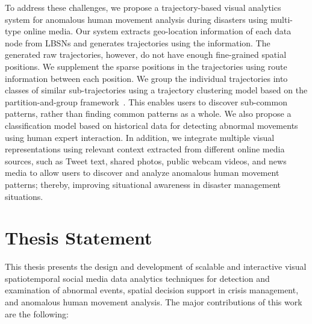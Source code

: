 To address these challenges, we propose a trajectory-based visual analytics system for anomalous human movement analysis during disasters using multi-type online media.
Our system extracts geo-location information of each data node from LBSNs and generates trajectories using the information.
The generated raw trajectories, however, do not have enough fine-grained spatial positions.
We supplement the sparse positions in the trajectories using route information between each position.
We group the individual trajectories into classes of similar sub-trajectories using a trajectory clustering model based on the partition-and-group framework~\cite{Lee:2007:Trajectory}.
This enables users to discover sub-common patterns, rather than finding common patterns as a whole.
We also propose a classification model based on historical data for detecting abnormal movements using human expert interaction.
In addition, we integrate multiple visual representations using relevant context extracted from different online media sources, such as Tweet text, shared photos, public webcam videos, and news media to allow users to discover and analyze anomalous human movement patterns; thereby, improving situational awareness in disaster management situations. 

\section{ Thesis Statement}
\label{sec:statement}

This thesis presents the design and development of scalable and interactive visual spatiotemporal social media data analytics techniques for detection and examination of abnormal events, spatial decision support in crisis management, and anomalous human movement analysis.
The major contributions of this work are the following:

